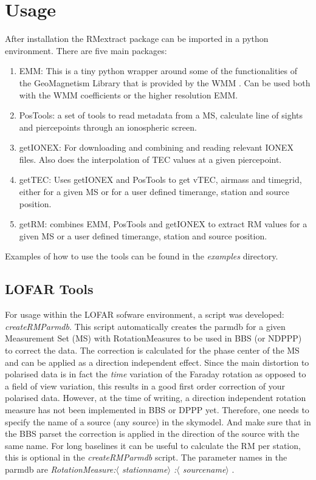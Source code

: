 \documentclass{article}
\begin{document}
\section{Usage}
After installation the RMextract package can be imported in a python
environment. There are five main packages: 
\begin{enumerate} 
\item EMM: This is a tiny python wrapper around some of the functionalities of
  the GeoMagnetism Library that is provided by the WMM \cite{wmm}. Can be used
  both with the WMM coefficients or the higher resolution EMM.
\item PosTools: a set of tools to read metadata from a MS, calculate line of
  sights and piercepoints through an ionospheric screen.
\item getIONEX: For downloading and combining and reading relevant IONEX
  files. Also does the interpolation of TEC values at a given piercepoint.
\item getTEC: Uses getIONEX and PosTools to get vTEC, airmass and timegrid,
  either for a given MS or for a user defined timerange, station and source
  position.
\item getRM: combines EMM, PosTools and getIONEX to extract RM values for a
  given MS or a user defined timerange, station and source
  position.
\end{enumerate}

Examples of how to use the tools can be found in the \emph{examples} directory.



\subsection{LOFAR Tools}
For usage within the LOFAR sofware environment, a script was
developed: \emph{createRMParmdb}. This script automatically creates  the
parmdb for a given Measurement Set (MS) with RotationMeasures to be used in
BBS (or NDPPP) to correct the data. The correction is calculated for the phase
center of the MS and can be  applied as a direction independent effect. Since
the main distortion to polarised data is in fact the \emph{time} variation of
the Faraday rotation as opposed to a field of view variation, this results in
a good first order correction of your polarised data. However, at the time of
writing, a direction independent rotation measure has not been implemented in
BBS or DPPP yet. Therefore, one needs to specify the name of a source (any
source) in the skymodel. And make sure that in the BBS parset the correction
is applied in the direction of the source with the same name. For long
baselines it can be useful to calculate the RM per station, this is optional
in the \emph{createRMParmdb} script. The parameter names in the parmdb are
\emph{RotationMeasure:$\langle$ stationname$\rangle$ :$\langle$ sourcename$\rangle$ }.
\end{document}
